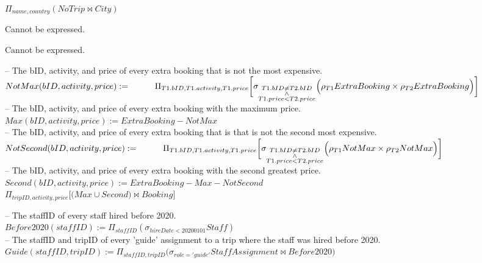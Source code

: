 \documentclass{article}
\newcommand{\var}[1]{\mathit{#1}}
\begin{document}
\begin{enumerate}
{    $\Pi_{name,country} (NoTrip \bowtie City)$
    \item Cannot be expressed.
    \item Cannot be expressed.
    \item -- The bID, activity, and price of every extra booking that is not the most expensive. \\[5pt]
    $NotMax(bID, activity, price) := \\[5pt]
    \hspace*{1cm} \Pi_{T1.bID, T1.activity, T1.price} \bigg[ \sigma_{\substack{T1.bID \neq T2.bID \\ \wedge \\ T1.price < T2.price}} \Big( \rho_{T1} ExtraBooking \times \rho_{T2} ExtraBooking \Big) \bigg]$ \\[10pt]
    -- The bID, activity, and price of every extra booking with the maximum price. \\[5pt]
    $Max(bID, activity, price) := ExtraBooking - NotMax$ \\[10pt]
    -- The bID, activity, and price of every extra booking that is that is not the second most expensive. \\[5pt]
    $NotSecond(bID, activity, price) := \\[5pt]
    \hspace*{1cm} \Pi_{T1.bID, T1.activity, T1.price} \bigg[ \sigma_{\substack{T1.bID \neq T2.bID \\ \wedge \\ T1.price < T2.price}} \Big( \rho_{T1} NotMax \times \rho_{T2} NotMax \Big) \bigg]$ \\[10pt]
    -- The bID, activity, and price of every extra booking with the second greatest price. \\[5pt]
    $Second(bID, activity, price) := ExtraBooking - Max - NotSecond$ \\[10pt]
    $\Pi_{tripID, activity, price} \bigg[ \Big(Max \cup Second \Big) \bowtie Booking \bigg]$
    \item -- The staffID of every staff hired before 2020. \\[5pt]
    $Before2020(\var{staffID}) := \Pi_{\var{staffID}} (\sigma_{hireDate < 20200101} \var{Staff})$ \\[10pt]
    -- The staffID and tripID of every 'guide' assignment to a trip where the staff was hired before 2020. \\[5pt]
    $Guide(\var{staffID}, tripID) := \Pi_{\var{staffID}, tripID} \Big( \sigma_{role='guide'} \var{StaffAssignment} \bowtie \var{Before2020} \Big)$ \\[10pt]
}
\end{enumerate}
\end{document}

